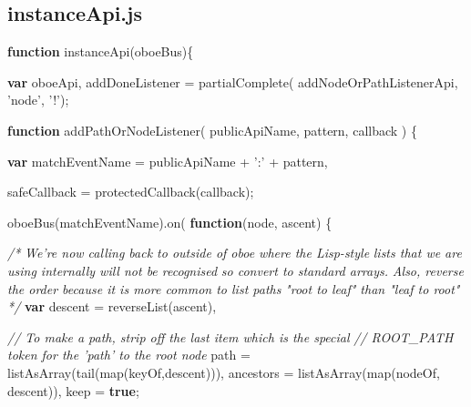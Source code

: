 \documentclass[12pt, ]{article}
\newenvironment{Shaded}{}{}
\newcommand{\KeywordTok}[1]{\textcolor[rgb]{0.00,0.44,0.13}{\textbf{{#1}}}}
\newcommand{\StringTok}[1]{\textcolor[rgb]{0.25,0.44,0.63}{{#1}}}
\newcommand{\CommentTok}[1]{\textcolor[rgb]{0.38,0.63,0.69}{\textit{{#1}}}}
\newcommand{\FunctionTok}[1]{\textcolor[rgb]{0.02,0.16,0.49}{{#1}}}
\newcommand{\NormalTok}[1]{{#1}}
\begin{document}
\pagebreak

\subsection{instanceApi.js}\label{headerux5finstanceApi}

\label{src_instanceApi}

\begin{Shaded}
\begin{Highlighting}[]

\KeywordTok{function} \FunctionTok{instanceApi}\NormalTok{(oboeBus)\{}

   \KeywordTok{var} \NormalTok{oboeApi,}
       \NormalTok{addDoneListener = }\FunctionTok{partialComplete}\NormalTok{(}
           \NormalTok{addNodeOrPathListenerApi, }
           \StringTok{'node'}\NormalTok{, }\StringTok{'!'}\NormalTok{);}
   
   
   \KeywordTok{function} \FunctionTok{addPathOrNodeListener}\NormalTok{( publicApiName, pattern, callback ) \{}
   
      \KeywordTok{var} \NormalTok{matchEventName = publicApiName + }\StringTok{':'} \NormalTok{+ pattern,          }
          
          \NormalTok{safeCallback = }\FunctionTok{protectedCallback}\NormalTok{(callback);}
                              
      \FunctionTok{oboeBus}\NormalTok{(matchEventName).}\FunctionTok{on}\NormalTok{(  }\KeywordTok{function}\NormalTok{(node, ascent) \{}
      
         \CommentTok{/* }
\CommentTok{            We're now calling back to outside of oboe where the Lisp-style }
\CommentTok{            lists that we are using internally will not be recognised }
\CommentTok{            so convert to standard arrays. }
\CommentTok{      }
\CommentTok{            Also, reverse the order because it is more common to list paths }
\CommentTok{            "root to leaf" than "leaf to root" }
\CommentTok{         */}
         \KeywordTok{var} \NormalTok{descent     = }\FunctionTok{reverseList}\NormalTok{(ascent),}
         
             \CommentTok{// To make a path, strip off the last item which is the special}
             \CommentTok{// ROOT_PATH token for the 'path' to the root node}
             \NormalTok{path       = }\FunctionTok{listAsArray}\NormalTok{(}\FunctionTok{tail}\NormalTok{(}\FunctionTok{map}\NormalTok{(keyOf,descent))),}
             \NormalTok{ancestors  = }\FunctionTok{listAsArray}\NormalTok{(}\FunctionTok{map}\NormalTok{(nodeOf, descent)),}
             \NormalTok{keep       = }\KeywordTok{true}\NormalTok{;}
             

\end{Highlighting}
\end{Shaded}
\end{document}
